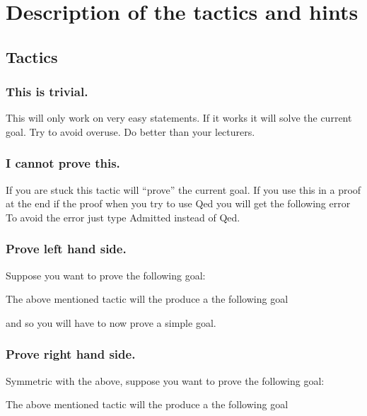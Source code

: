 \part{ Description of the tactics and hints}
\chapter{Tactics}

\section{This is trivial.}

This will only work on very easy statements. If it works it will solve the current goal. Try to avoid overuse. Do better than your lecturers.


\section{I cannot prove this.}

If you are stuck this tactic will ``prove'' the current goal. If you use this in a proof at the end if the proof when you try to use Qed you will get the following error
To avoid the error just type Admitted instead of Qed.


\section{Prove left hand side.}
Suppose you want to prove the following goal:

The above mentioned tactic will the produce a the following goal

 and so you will have to now prove a simple goal.

\section{Prove right hand side.}
Symmetric with the above, suppose you want to prove the following goal:

The above mentioned tactic will the produce a the following goal

